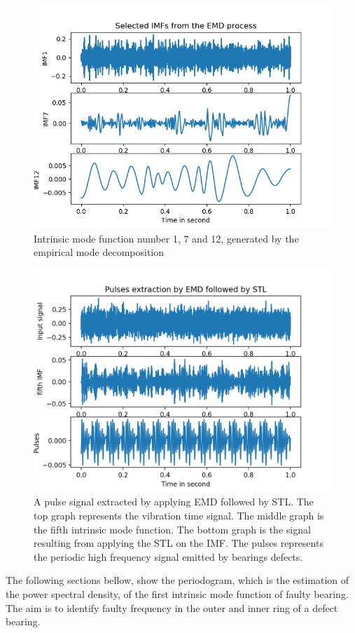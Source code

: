 \documentclass[../Main/thesis.tex]{subfiles}
\begin{document}
\begin{figure}[H] %
	\centering
	\includegraphics[width=8in]{../fig/selected_imf.png} 
	\caption{Intrinsic mode function number 1, 7 and 12, generated by the empirical mode decomposition}
	\label{fig:imf}
\end{figure}
\justify

\begin{figure}[H] %
   \centering
   \includegraphics[width=8in]{../fig/emd-stl.png} 
   \caption{ A pulse signal extracted by applying EMD followed by STL. The top graph represents the vibration time signal. The middle graph is the fifth intrinsic mode function. The bottom graph is the signal resulting from applying the STL on the IMF. The pulses represents the periodic high frequency signal emitted by bearings defects.}
   \label{fig:emd-stl}
\end{figure}
\justify
The following sections bellow, show the periodogram, which is the estimation of the power spectral density, of the first intrinsic mode function of faulty bearing. The aim is to identify faulty frequency in the outer and inner ring of a defect bearing.
\end{document}
